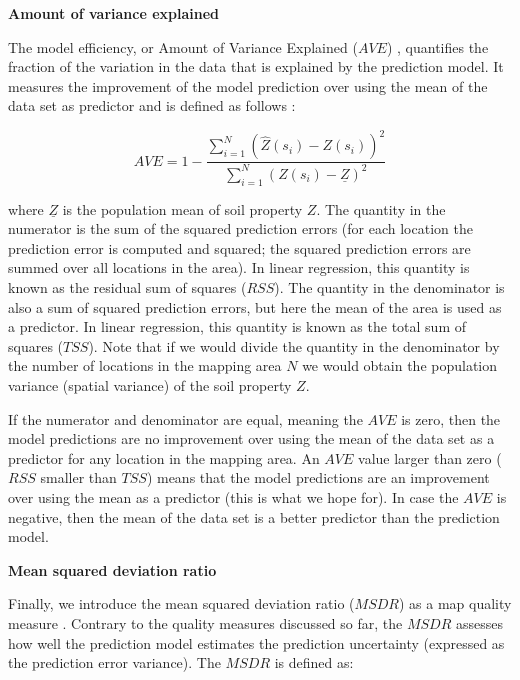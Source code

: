 \documentclass[10pt,b5paper,]{book}
\theoremstyle{definition}
\theoremstyle{definition}
\theoremstyle{definition}
\theoremstyle{remark}
\begin{document}
\textbf{Amount of variance explained}

The model efficiency, or Amount of Variance Explained (\({AVE}\))
\citep[\citet{samuel2015more}]{angelini2016mapping}, quantifies the
fraction of the variation in the data that is explained by the
prediction model. It measures the improvement of the model prediction
over using the mean of the data set as predictor and is defined as
follows \citep{krause2005comparison}:

\begin{equation}
A V E = 1 -  \frac{\sum_{i=1}^{N} (\hat{Z}(s_i) - Z(s_i))^2}{\sum_{i=1}^{N}  (Z(s_i) - \underline{Z})^2}
\end{equation}

where \({\underline{Z}}\) is the population mean of soil property \(Z\).
The quantity in the numerator is the sum of the squared prediction
errors (for each location the prediction error is computed and squared;
the squared prediction errors are summed over all locations in the
area). In linear regression, this quantity is known as the residual sum
of squares (\({RSS}\)). The quantity in the denominator is also a sum of
squared prediction errors, but here the mean of the area is used as a
predictor. In linear regression, this quantity is known as the total sum
of squares (\({TSS}\)). Note that if we would divide the quantity in the
denominator by the number of locations in the mapping area \(N\) we
would obtain the population variance (spatial variance) of the soil
property \(Z\).

If the numerator and denominator are equal, meaning the \({AVE}\) is
zero, then the model predictions are no improvement over using the mean
of the data set as a predictor for any location in the mapping area. An
\({AVE}\) value larger than zero (\({RSS}\) smaller than \({TSS}\))
means that the model predictions are an improvement over using the mean
as a predictor (this is what we hope for). In case the \({AVE}\) is
negative, then the mean of the data set is a better predictor than the
prediction model.

\textbf{Mean squared deviation ratio}

Finally, we introduce the mean squared deviation ratio (\({MSDR}\)) as a
map quality measure
\citep{kempen2010pedometric, lark2000comparison, voltz1990comparison, webster_2007}.
Contrary to the quality measures discussed so far, the \({MSDR}\)
assesses how well the prediction model estimates the prediction
uncertainty (expressed as the prediction error variance). The \({MSDR}\)
is defined as:
\end{document}
